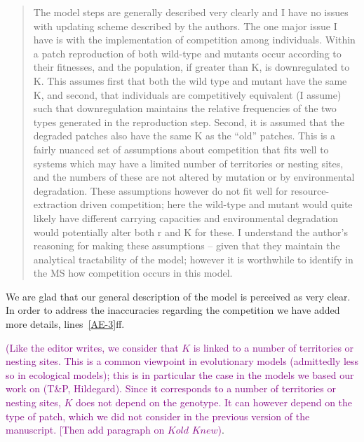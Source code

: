 \documentclass[11pt]{article}
\newenvironment{referee}{\vspace{0.cm} \sffamily \color{colreferee} \begin{quotation} }{\end{quotation} \vspace{0.cm}}
\newcommand{\lmarginpar}[1]{\reversemarginpar\marginpar{\textcolor{colreferee}{\textbf{\textsf{[#1]}}}}}
\newcommand{\addnb}[1]{\refstepcounter{numcom}\lmarginpar{\arabic{numcom}}\label{#1}}
\newcommand{\florence}[1]{\textcolor{purple}{(#1)}}
\newcounter{numcom}
\begin{document}
\begin{referee}
The \addnb{AE3}model steps are generally described very clearly and I have no issues with updating scheme described by the authors.   The one major issue I have is with the implementation of competition among individuals.   Within a patch reproduction of both wild-type and mutants occur according to their fitnesses, and the population, if greater than K, is downregulated to K.   This assumes first that both the wild type and mutant have the same K, and second, that individuals are competitively equivalent (I assume) such that downregulation maintains the relative frequencies of the two types generated in the reproduction step. Second, it is assumed that the degraded patches also have the same K as the “old” patches.    This is a fairly nuanced set of assumptions about competition that fits well to systems which may have a limited number of territories or nesting sites, and the numbers of these are not altered by mutation or by environmental degradation.   These assumptions however do not
fit well for resource-extraction driven competition; here the wild-type and mutant would quite likely have different carrying capacities and environmental degradation would potentially alter both r and K for these.   I understand the author’s reasoning for making these assumptions – given that they maintain the analytical tractability of the model; however it is worthwhile to identify in the MS how competition occurs in this model. 
\end{referee}
%
We are glad that our general description of the model is perceived as very clear. In order to address the inaccuracies regarding the competition we have added more details, lines~\ref{AE-3}ff. 

\florence{Like the editor writes, we consider that $K$ is linked to a number of territories or nesting sites. This is a common viewpoint in evolutionary models (admittedly less so in ecological models); this is in particular the case in the models we based our work on (T\&P, Hildegard). 
Since it corresponds to a number of territories or nesting sites, $K$ does not depend on the genotype. It can however depend on the type of patch, which we did not consider in the previous version of the manuscript. [Then add paragraph on $Kold$ $Knew$}.
\end{document}
